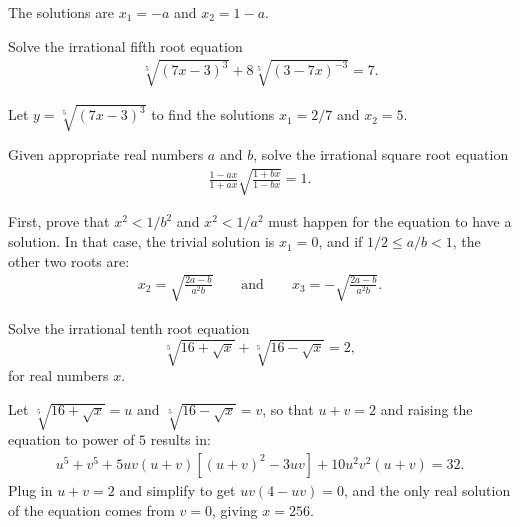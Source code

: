 \documentclass[12pt,a4paper]{memoir}
\theoremstyle{definition}
\begin{document}
\begin{solution}
	The solutions are $x_1=-a$ and $x_2=1-a$.
\end{solution}


\begin{question}\label{p:irrational-H}
	Solve the irrational fifth root equation 
	\begin{align*}
		\sqrt[5]{(7x-3)^3}+8\sqrt[5]{(3-7x)^{-3}}=7.
	\end{align*}
\end{question}

\begin{solution}
	Let $y=\sqrt[5]{(7x-3)^3}$ to find the solutions $x_1=2/7$ and $x_2=5$.
\end{solution}

\begin{question}\label{p:irrational-I}
	Given appropriate real numbers $a$ and $b$, solve the irrational square root equation
	\begin{align*}
		\frac{1-ax}{1+ax}\sqrt{\frac{1+bx}{1-bx}}=1.
	\end{align*}
\end{question}

\begin{solution}
	First, prove that $x^2<1/b^2$ and $x^2<1/a^2$ must happen for the equation to have a solution. In that case, the trivial solution is $x_1=0$, and if $1/2 \leq a/b < 1$, the other two roots are:
	\begin{align*}
		x_2 = \sqrt{\frac{2a-b}{a^2b}} \qquad \text{and} \qquad x_3 = -\sqrt{\frac{2a-b}{a^2b}}.
	\end{align*}
\end{solution}


\begin{question}\label{p:irrational-J}
	Solve the irrational tenth root equation \[\sqrt[5]{16+\sqrt{x}}+\sqrt[5]{16-\sqrt{x}}=2,\] for real numbers $x$.
\end{question}

\begin{solution}
	Let $\sqrt[5]{16+\sqrt{x}}=u$ and $\sqrt[5]{16-\sqrt{x}}=v$, so that $u+v=2$ and raising the equation to power of $5$ results in:
	\begin{align*}
		u^5+v^5+5uv(u+v)\left[(u+v)^2-3uv\right]+10u^2v^2(u+v)=32.
	\end{align*}
	Plug in $u+v=2$ and simplify to get $uv(4-uv)=0$, and the only real solution of the equation comes from $v=0$, giving $x=256$.
\end{solution}
\end{document}
